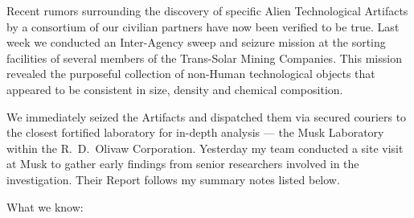 \documentclass[letterpaper,10pt]{texMemo} %
\begin{document}
\maketitle %
\vspace{-1.5em}
\noindent Recent rumors surrounding the discovery of specific Alien Technological Artifacts by a consortium of our civilian partners have now been verified to be true. Last week we conducted an Inter-Agency sweep and seizure mission at the sorting facilities of several members of the Trans-Solar Mining Companies. This mission revealed the purposeful collection of non-Human technological objects that appeared to be consistent in size, density and chemical composition.

\noindent We immediately seized the Artifacts and dispatched them via secured couriers to the closest fortified laboratory for in-depth analysis --- the Musk Laboratory within the R.~D.~Olivaw Corporation. Yesterday my team conducted a site visit at Musk to gather early findings from senior researchers involved in the investigation. Their Report follows my summary notes listed below.

\bigskip
\noindent What we know:
\end{document}
